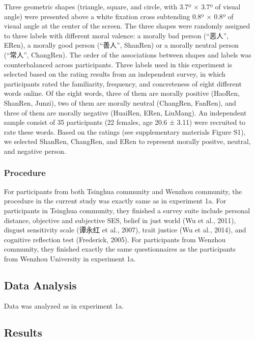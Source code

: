 \documentclass[
  english,
  man]{apa6}
\begin{document}
Three geometric shapes (triangle, square, and circle, with 3.7º × 3.7º of visual angle) were presented above a white fixation cross subtending 0.8º × 0.8º of visual angle at the center of the screen. The three shapes were randomly assigned to three labels with different moral valence: a morally bad person (\enquote{恶人}, ERen), a morally good person (\enquote{善人}, ShanRen) or a morally neutral person (\enquote{常人}, ChangRen). The order of the associations between shapes and labels was counterbalanced across participants.
Three labels used in this experiment is selected based on the rating results from an independent survey, in which participants rated the familiarity, frequency, and concreteness of eight different words online. Of the eight words, three of them are morally positive (HaoRen, ShanRen, Junzi), two of them are morally neutral (ChangRen, FanRen), and three of them are morally negative (HuaiRen, ERen, LiuMang). An independent sample consist of 35 participants (22 females, age 20.6 ± 3.11) were recruited to rate these words. Based on the ratings (see supplementary materials Figure S1), we selected ShanRen, ChangRen, and ERen to represent morally positve, neutral, and negative person.

\hypertarget{procedure-1}{%
\subsubsection{Procedure}\label{procedure-1}}

For participants from both Tsinghua community and Wenzhou community, the procedure in the current study was exactly same as in experiment 1a. For participants in Tsinghua community, they finished a survey suite include personal distance, objective and subjective SES, belief in just world (Wu et al., 2011), disgust sensitivity scale (谭永红 et al., 2007), trait justice (Wu et al., 2014), and cognitive reflection test (Frederick, 2005). For participants from Wenzhou community, they finished exactly the same questionnaires as the participants from Wenzhou University in experiment 1a.

\hypertarget{data-analysis-1}{%
\subsection{Data Analysis}\label{data-analysis-1}}

Data was analyzed as in experiment 1a.

\hypertarget{results-1}{%
\subsection{Results}\label{results-1}}
\end{document}
